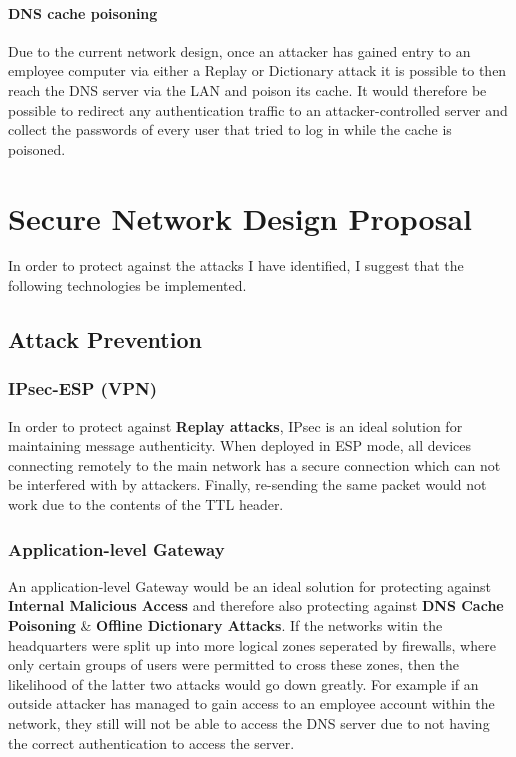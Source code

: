 \documentclass[11pt]{article}
\begin{document}
      \paragraph{DNS cache poisoning}
        Due to the current network design, once an attacker has gained entry to an employee computer via either a Replay or Dictionary attack it is possible to then reach the DNS server via the LAN and poison its cache. It would therefore be possible to redirect any authentication traffic to an attacker-controlled server and collect the passwords of every user that tried to log in while the cache is poisoned.

    \section{Secure Network Design Proposal}
      In order to protect against the attacks I have identified, I suggest that the following technologies be implemented.

      \subsection{Attack Prevention}
        \subsubsection{IPsec-ESP (VPN)} \label{ipsec}
          In order to protect against \textbf{Replay attacks}, IPsec is an ideal solution for maintaining message authenticity. When deployed in ESP mode, all devices connecting remotely to the main network has a secure connection which can not be interfered with by attackers. Finally, re-sending the same packet would not work due to the contents of the TTL header.

        \subsubsection{Application-level Gateway} \label{app-gateway}
          An application-level Gateway would be an ideal solution for protecting against \textbf{Internal Malicious Access} and therefore also protecting against \textbf{DNS Cache Poisoning} \& \textbf{Offline Dictionary Attacks}. If the networks witin the headquarters were split up into more logical zones seperated by firewalls, where only certain groups of users were permitted to cross these zones, then the likelihood of the latter two attacks would go down greatly. For example if an outside attacker has managed to gain access to an employee account within the network, they still will not be able to access the DNS server due to not having the correct authentication to access the server.
\end{document}
